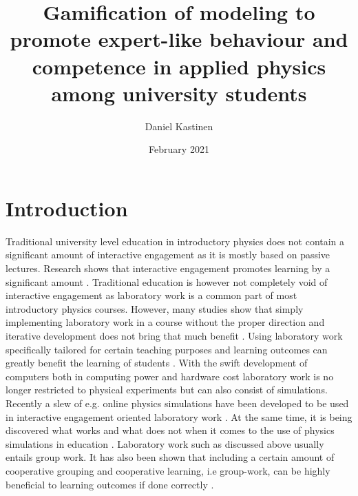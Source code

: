 \documentclass[11pt, twocolumn]{article}
\title{Gamification of modeling to promote expert-like behaviour and competence in applied physics among university students}
\author{Daniel Kastinen}
\date{February 2021}
\begin{document}
\maketitle

\section{Introduction}

Traditional university level education in introductory physics does not contain a significant amount of interactive engagement as it is mostly based on passive lectures. Research shows that interactive engagement promotes learning by a significant amount \citep{hake1998interactive, prince2004does}. Traditional education is however not completely void of interactive engagement as laboratory work is a common part of most introductory physics courses. However, many studies show that simply implementing laboratory work in a course without the proper direction and iterative development does not bring that much benefit \citep{holmes2018introductory, redish2004teaching}. Using laboratory work specifically tailored for certain teaching purposes and learning outcomes can greatly benefit the learning of students \citep{redish2004teaching}. With the swift development of computers both in computing power and hardware cost laboratory work is no longer restricted to physical experiments but can also consist of simulations. Recently a slew of e.g. online physics simulations have been developed to be used in interactive engagement oriented laboratory work \citep{zhou2018websites}. At the same time, it is being discovered what works and what does not when it comes to the use of physics simulations in education \citep{wieman2008oersted}. Laboratory work such as discussed above usually entails group work. It has also been shown that including a certain amount of cooperative grouping and cooperative learning, i.e group-work, can be highly beneficial to learning outcomes if done correctly \citep{heller1992teachinga}.
\end{document}
